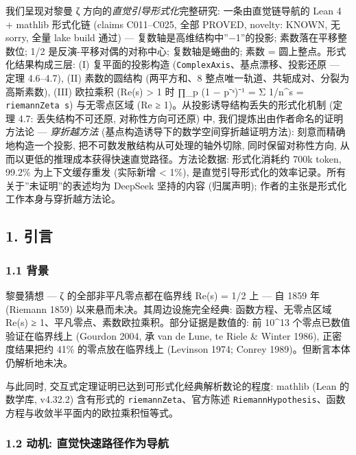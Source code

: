 \documentclass[
]{article}
\begin{document}
我们呈现对黎曼 ζ 方向的\emph{直觉引导形式化}完整研究: 一条由直觉链导航的
Lean 4 + mathlib 形式化链 (claims C011--C025, 全部 PROVED, novelty:
KNOWN, 无 sorry, 全量 lake build 通过) ---
复数轴是高维结构中''−1''的投影; 素数落在平移整数位; 1/2
是反演-平移对偶的对称中心; 复数轴是蜷曲的; 素数 =
圆上整点。形式化结果构成三层: (I) 复平面的投影构造
(\texttt{ComplexAxis}、基点漂移、投影还原 --- 定理 4.6--4.7), (II)
素数的圆结构 (两平方和、8 整点唯一轨道、共轭成对、分裂为高斯素数), (III)
欧拉乘积 (Re(s) \textgreater{} 1 时 ∏\_p (1 − p⁻ˢ)⁻¹ = Σ 1/n\^{}s =
\texttt{riemannZeta\ s}) 与无零点区域 (Re ≥
1)。从投影诱导结构丢失的形式化机制 (定理 4.7: 丢失结构不可还原,
对称性方向可还原) 中, 我们提炼出由作者命名的证明方法论 ---
\emph{穿折越方法} (基点构造诱导下的数学空间穿折越证明方法):
刻意而精确地构造一个投影, 把不可数发散结构从可处理的轴外切除,
同时保留对称性方向, 从而以更低的推理成本获得快速直觉路径。方法论数据:
形式化消耗约 700k token, 99.2\% 为上下文缓存重发 (实际新增 \textless{}
1\%), 是直觉引导形式化的效率记录。所有关于''未证明''的表述均为 DeepSeek
坚持的内容 (归属声明); 作者的主张是形式化工作本身与穿折越方法论。

\subsection{1. 引言}\label{ux5f15ux8a00}

\subsubsection{1.1 背景}\label{ux80ccux666f}

黎曼猜想 --- ζ 的全部非平凡零点都在临界线 Re(s) = 1/2 上 --- 自 1859 年
(Riemann 1859) 以来悬而未决。其周边设施完全经典: 函数方程、无零点区域
Re(s) ≥ 1、平凡零点、素数欧拉乘积。部分证据是数值的: 前 10\^{}13
个零点已数值验证在临界线上 (Gourdon 2004, 承 van de Lune, te Riele \&
Winter 1986), 正密度结果把约 41\% 的零点放在临界线上 (Levinson 1974;
Conrey 1989)。但断言本体仍解析地未决。

与此同时, 交互式定理证明已达到可形式化经典解析数论的程度: mathlib (Lean
的数学库, v4.32.2) 含有形式的 \texttt{riemannZeta}、官方陈述
\texttt{RiemannHypothesis}、函数方程与收敛半平面内的欧拉乘积恒等式。

\subsubsection{1.2 动机:
直觉快速路径作为导航}\label{ux52a8ux673a-ux76f4ux89c9ux5febux901fux8defux5f84ux4f5cux4e3aux5bfcux822a}
\end{document}
